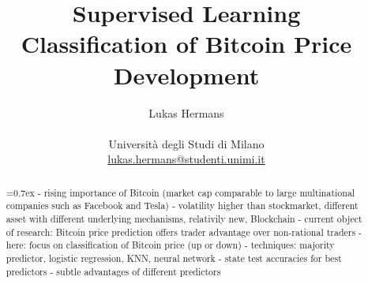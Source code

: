 \title{\large Supervised Learning \\ \LARGE
 Classification of Bitcoin Price Development}
\author{Lukas Hermans\\ \\
{Università degli Studi di Milano} \\
\href{mailto:lukas.hermans@studenti.unimi.it}
{lukas.hermans@studenti.unimi.it}}

\maketitle

\begin{abstract} 
\noindent
{}\font=0.7ex%
- rising importance of Bitcoin (market cap comparable to large multinational companies such as Facebook and Tesla)
- volatility higher than stockmarket, different asset with different underlying mechanisms, relativily new, Blockchain
- current object of research: Bitcoin price prediction offers trader advantage over non-rational traders
- here: focus on classification of Bitcoin price (up or down)
- techniques: majority predictor, logistic regression, KNN, neural network
- state test accuracies for best predictors
- subtle advantages of different predictors 
\end{abstract}
